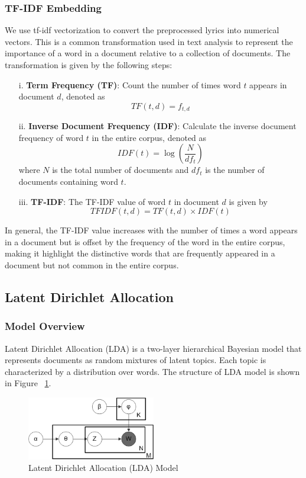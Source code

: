 \documentclass{article}
\begin{document}
\subsubsection{TF-IDF Embedding}
We use tf-idf vectorization to convert the preprocessed lyrics into numerical vectors. This is a common transformation used in text analysis to represent the importance of a word in a document relative to a collection of documents. The transformation is given by the following steps:
\begin{enumerate}
    \item [i.] \textbf{Term Frequency (TF)}: Count the number of times word $t$ appears in document $d$, denoted as \[TF(t,d)=f_{t,d}\]
    \item [ii.] \textbf{Inverse Document Frequency (IDF)}: Calculate the inverse document frequency of word $t$ in the entire corpus, denoted as \[IDF(t)=\log\left(\frac{N}{df_t}\right)\]
    where $N$ is the total number of documents and $df_t$ is the number of documents containing word $t$.
    \item [iii.] \textbf{TF-IDF}: The TF-IDF value of word $t$ in document $d$ is given by \[TFIDF(t,d)=TF(t,d)\times IDF(t)\]
\end{enumerate}

\noindent In general, the TF-IDF value increases with the number of times a word appears in a document but is offset by the frequency of the word in the entire corpus, making it highlight the distinctive words that are frequently appeared in a document but not common in the entire corpus.

\subsection{Latent Dirichlet Allocation}
\subsubsection{Model Overview}
Latent Dirichlet Allocation (LDA) is a two-layer hierarchical Bayesian model that represents documents as random mixtures of latent topics. Each topic is characterized by a distribution over words. The structure of LDA model is shown in Figure ~\ref{fig:lda}. 


\begin{figure}[H]
    \centering
    \includegraphics[width=0.5\textwidth]{lda.png}
    \caption{Latent Dirichlet Allocation (LDA) Model}
    \label{fig:lda}
\end{figure}
\end{document}
